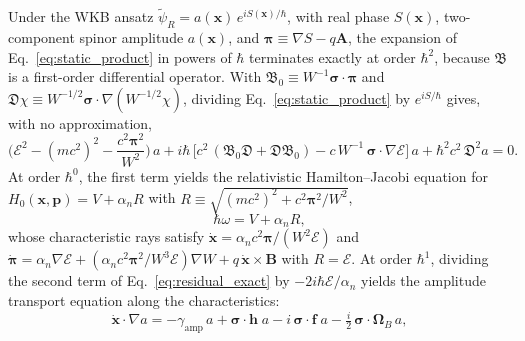 \documentclass[aps,prd,onecolumn,tightenlines,nofootinbib,notitlepage,11pt,floatfix]{revtex4-2}
\theoremstyle{indentedtheorem}
\begin{document}
Under the WKB ansatz $\tilde{\psi}_R = a(\mathbf{x})\,e^{iS(\mathbf{x})/\hbar}$, with real phase $S(\mathbf{x})$, two-component spinor amplitude $a(\mathbf{x})$, and $\boldsymbol{\pi} \equiv \nabla S - q\mathbf{A}$, the expansion of Eq.~\eqref{eq:static_product} in powers of $\hbar$ terminates exactly at order $\hbar^2$, because $\mathfrak{B}$ is a first-order differential operator. With $\mathfrak{B}_0 \equiv W^{-1}\boldsymbol{\sigma}\cdot\boldsymbol{\pi}$ and $\mathfrak{D}\chi \equiv W^{-1/2}\boldsymbol{\sigma}\cdot\nabla(W^{-1/2}\chi)$, dividing Eq.~\eqref{eq:static_product} by $e^{iS/\hbar}$ gives, with no approximation,
\begin{equation}
    \Big(\mathcal{E}^2-(mc^2)^2-\frac{c^2\boldsymbol{\pi}^2}{W^2}\Big)\,a + i\hbar\,\big[c^2\,(\mathfrak{B}_0\mathfrak{D}+\mathfrak{D}\mathfrak{B}_0)-c\,W^{-1}\,\boldsymbol{\sigma}\cdot\nabla\mathcal{E}\big]\,a + \hbar^2c^2\,\mathfrak{D}^2a = 0 .
    \label{eq:residual_exact}
\end{equation}
At order $\hbar^0$, the first term yields the relativistic Hamilton--Jacobi equation for $H_0(\mathbf{x},\mathbf{p}) = V + \alpha_n R$ with $R \equiv \sqrt{(mc^2)^2 + c^2\boldsymbol{\pi}^2/W^2}$,
\begin{equation}
    \hbar\omega = V + \alpha_n R ,
    \label{eq:wkb_phase}
\end{equation}
whose characteristic rays satisfy $\dot{\mathbf{x}} = \alpha_n c^2\boldsymbol{\pi}/(W^2\mathcal{E})$ and $\dot{\boldsymbol{\pi}} = \alpha_n\nabla\mathcal{E} + (\alpha_n c^2\boldsymbol{\pi}^2/W^3\mathcal{E})\nabla W + q\,\dot{\mathbf{x}}\times\mathbf{B}$ with $R=\mathcal{E}$. At order $\hbar^1$, dividing the second term of Eq.~\eqref{eq:residual_exact} by $-2i\hbar\mathcal{E}/\alpha_n$ yields the amplitude transport equation along the characteristics:
\begin{equation}
    \dot{\mathbf{x}}\cdot\nabla a = -\gamma_\text{amp}\,a +\boldsymbol{\sigma}\cdot\mathbf{h}\;a - i\,\boldsymbol{\sigma}\cdot\mathbf{f}\;a - \tfrac{i}{2}\,\boldsymbol{\sigma}\cdot\boldsymbol{\Omega}_B\,a ,
    \label{eq:wkb_transport}
\end{equation}
\end{document}

